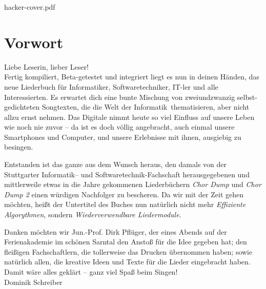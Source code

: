 \documentclass[11pt,a5paper]{article}
\def\maketitle{
	\vspace*{0.5cm}
	\begin{overpic}[width=12.5cm]{hacker-cover.pdf}
	\end{overpic}
}
\begin{document}
		
\maketitle
\thispagestyle{empty}
\pagebreak
\tableofcontents
\pagebreak

\small




\section*{Vorwort}

Liebe Leserin, lieber Leser! \\
			
Fertig kompiliert, Beta-getestet und integriert liegt es nun in deinen Händen, das neue Liederbuch für Informatiker, Softwaretechniker, IT-ler und alle Interessierten. 
Es erwartet dich eine bunte Mischung von zweiundzwanzig selbst-gedichteten Songtexten, die die \glqq Welt der Informatik\grqq \ thematisieren, aber nicht allzu ernst nehmen. Das Digitale nimmt heute so viel Einfluss auf unsere Leben wie noch nie zuvor -- da ist es doch völlig angebracht, auch einmal unsere Smartphones und Computer, und unsere Erlebnisse mit ihnen, ausgiebig zu besingen.

Entstanden ist das ganze aus dem Wunsch heraus, den damals von der Stuttgarter Informatik-- und Softwaretechnik-Fachschaft herausgegebenen und mittlerweile etwas in die Jahre gekommenen Liederbüchern \emph{Chor Dump} und \emph{Chor Dump 2} einen würdigen Nachfolger zu bescheren.
Da wir mit der Zeit gehen möchten, heißt der Untertitel des Buches nun natürlich nicht mehr \emph{Effiziente Algorythmen}, sondern \emph{Wiederverwendbare Liedermodule}.

Danken möchten wir Jun.-Prof. Dirk Pflüger, der eines Abends auf der Ferienakademie im schönen Sarntal den Anstoß für die Idee gegeben hat; den fleißigen Fachschaftlern, die tollerweise das Drucken übernommen haben; sowie natürlich allen, die kreative Ideen und Texte für die Lieder eingebracht haben. \\

Damit wäre alles geklärt -- ganz viel Spaß beim Singen! \\

\hfill Dominik Schreiber \\

\ \\
\end{document}
